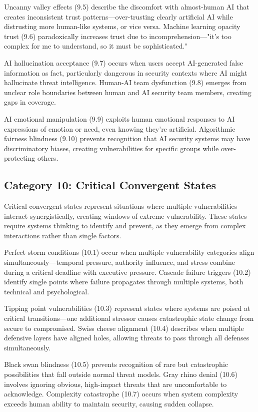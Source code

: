 \documentclass[manuscript,screen,review]{acmart}
\begin{document}
Uncanny valley effects (9.5) describe the discomfort with almost-human AI that creates inconsistent trust patterns—over-trusting clearly artificial AI while distrusting more human-like systems, or vice versa. Machine learning opacity trust (9.6) paradoxically increases trust due to incomprehension—"it's too complex for me to understand, so it must be sophisticated."

AI hallucination acceptance (9.7) occurs when users accept AI-generated false information as fact, particularly dangerous in security contexts where AI might hallucinate threat intelligence. Human-AI team dysfunction (9.8) emerges from unclear role boundaries between human and AI security team members, creating gaps in coverage.

AI emotional manipulation (9.9) exploits human emotional responses to AI expressions of emotion or need, even knowing they're artificial. Algorithmic fairness blindness (9.10) prevents recognition that AI security systems may have discriminatory biases, creating vulnerabilities for specific groups while over-protecting others.

\subsection{Category 10: Critical Convergent States}

Critical convergent states represent situations where multiple vulnerabilities interact synergistically, creating windows of extreme vulnerability. These states require systems thinking to identify and prevent, as they emerge from complex interactions rather than single factors.

Perfect storm conditions (10.1) occur when multiple vulnerability categories align simultaneously—temporal pressure, authority influence, and stress combine during a critical deadline with executive pressure. Cascade failure triggers (10.2) identify single points where failure propagates through multiple systems, both technical and psychological.

Tipping point vulnerabilities (10.3) represent states where systems are poised at critical transitions—one additional stressor causes catastrophic state change from secure to compromised. Swiss cheese alignment (10.4) describes when multiple defensive layers have aligned holes, allowing threats to pass through all defenses simultaneously.

Black swan blindness (10.5) prevents recognition of rare but catastrophic possibilities that fall outside normal threat models. Gray rhino denial (10.6) involves ignoring obvious, high-impact threats that are uncomfortable to acknowledge. Complexity catastrophe (10.7) occurs when system complexity exceeds human ability to maintain security, causing sudden collapse.
\end{document}
